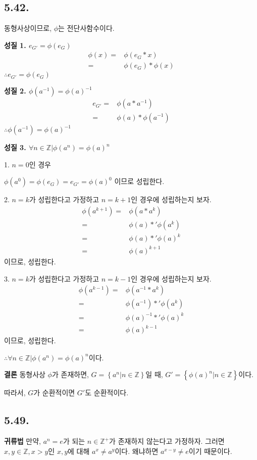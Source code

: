 \documentclass{article}
\begin{document}
\subsection{5.42.}
동형사상이므로, $\phi$는 전단사함수이다.

\textbf{성질 1. $e_{G'} = \phi(e_G)$}
\begin{align*}
\phi(x) =& \phi(e_G * x)
\\ =& \phi(e_G) * \phi(x)
\end{align*}
$\therefore e_{G'} = \phi(e_G)$

\textbf{성질 2. $\phi(a^{-1}) = \phi(a)^{-1}$}
\begin{align*}
e_{G'} =& \phi(a * a^{-1}) 
\\ =& \phi(a) * \phi(a^{-1})
\end{align*}
$\therefore \phi(a^{-1}) = \phi(a)^{-1}$

\textbf{성질 3. $\forall n \in \mathbb{Z} | \phi(a^n) = \phi(a)^n$}

1. $n=0$인 경우

$\phi(a^0) = \phi(e_G) = e_{G'} = \phi(a) ^ 0$
이므로 성립한다.

2. $n=k$가 성립한다고 가정하고 $n=k+1$인 경우에 성립하는지 보자.
\begin{align*}
\phi(a^{k+1}) =& \phi(a * a^k)
\\ =& \phi(a) *' \phi(a^k)
\\ =& \phi(a) *' \phi(a)^k
\\ =& \phi(a)^{k+1}
\end{align*}
이므로, 성립한다.

3. $n=k$가 성립한다고 가정하고 $n=k-1$인 경우에 성립하는지 보자.
\begin{align*}
\phi(a^{k-1}) =& \phi(a^{-1} * a^k)
\\ =& \phi(a^{-1}) *' \phi(a^k)
\\ =& \phi(a)^{-1} *' \phi(a)^k
\\ =& \phi(a)^{k-1}
\end{align*}
이므로, 성립한다.

$\therefore \forall n \in \mathbb{Z} |  \phi(a^n) = \phi(a)^n$이다.

\textbf{결론} 동형사상 $\phi$가 존재하면, $G = \left\{a^n | n \in \mathbb{Z} \right\}$일 때, $G' = \left\{\phi(a)^n | n \in \mathbb{Z}  \right\}$이다.

따라서, $G$가 순환적이면 $G'$도 순환적이다.


\subsection{5.49.}
\textbf{귀류법} 만약, $a^n = e$가 되는 $n \in \mathbb{Z}^{+}$가 존재하지 않는다고 가정하자.
그러면 $x, y \in \mathbb{Z}, x > y$인 $x, y$에 대해 $a^x \neq a^y$이다. 왜냐하면 $a^{x-y} \neq e$이기 때문이다.
\end{document}
